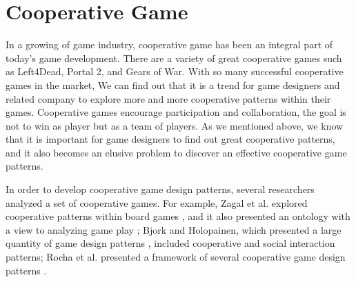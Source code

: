 \section{Cooperative Game}


In a growing of game industry, cooperative game has been an integral part of today's game development. There are a variety of great cooperative games such as Left4Dead, Portal 2, and Gears of War. With so many successful cooperative games in the market, We can find out that it is a trend for game designers and related company to explore more and more cooperative patterns within their games. Cooperative games encourage participation and collaboration, the goal is not to win as player but as a team of players. As we mentioned above, we know that it  is important for game designers to find out great cooperative patterns, and it also becomes an elusive problem to discover an effective cooperative game patterns.


In order to develop cooperative game design patterns, several researchers analyzed a set of cooperative games. For example, Zagal et al. explored cooperative patterns within board games \cite{CG1}, and it also presented an ontology with a view to analyzing game play \cite{CG3}; Bjork and Holopainen, which presented a large quantity of game design patterns \cite{CG2}, included cooperative and social interaction patterns; Rocha et al. presented a framework of several cooperative game design patterns \cite{CG4}.


